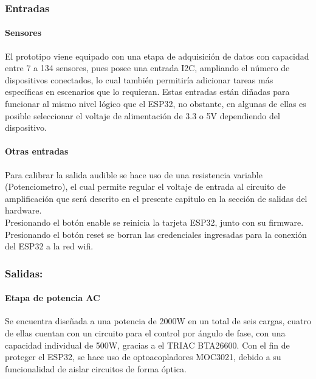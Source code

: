 	\subsubsection{Entradas}
	\paragraph{Sensores}
		El prototipo viene equipado con una etapa de adquisición de datos con capacidad entre 7 a 134 sensores, pues posee una entrada I2C, ampliando el número de dispositivos conectados, lo cual también permitiría adicionar tareas más específicas en escenarios que lo requieran. Estas entradas están diñadas para funcionar al mismo nivel lógico que el ESP32, no obstante, en algunas de ellas es posible seleccionar el voltaje de alimentación de 3.3 o 5V dependiendo del dispositivo.\\
			
	\paragraph{Otras entradas}
		Para calibrar la salida audible se hace uso de una resistencia variable (Potenciometro), el cual permite regular el voltaje de entrada al circuito de amplificación que será descrito en el presente capitulo en la sección de salidas del hardware.\\
		
		Presionando el botón enable se reinicia la tarjeta ESP32, junto con su firmware.\\
		
		Presionando el botón reset se borran las credenciales ingresadas para la conexión del ESP32 a la red wifi.\\
	
		
	\subsubsection{Salidas:}
	\paragraph{Etapa de potencia AC}
		Se encuentra diseñada a una potencia de 2000W en un total de seis cargas, cuatro de ellas cuentan con un circuito para el control por ángulo de fase, con una capacidad individual de 500W, gracias a el TRIAC BTA26600. Con el fin de proteger el ESP32, se hace uso de optoacopladores MOC3021, debido a su funcionalidad de aislar circuitos de forma óptica.\\
	
